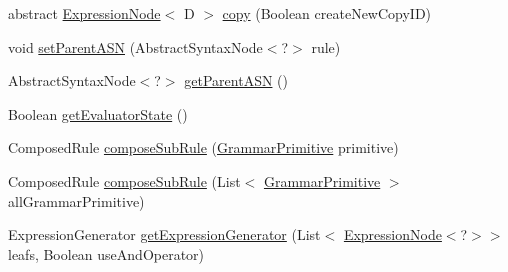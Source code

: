 \begin{DoxyCompactItemize}
\item 
abstract \hyperlink{classit_1_1emarolab_1_1cagg_1_1core_1_1language_1_1syntax_1_1expressionTree_1_1ExpressionNode_3_3eaf7c0f6a4bc47f4823e05ca883c5af_acfac8736e19e954def3e135de75d668e}{Expression\-Node}$<$ D $>$ \hyperlink{classit_1_1emarolab_1_1cagg_1_1core_1_1language_1_1syntax_1_1expressionTree_1_1ExpressionNode_3_3eaf7c0f6a4bc47f4823e05ca883c5af_a8ff9d73119feb83712da4b1f155a7e28}{copy} (Boolean create\-New\-Copy\-I\-D)
\item 
void \hyperlink{classit_1_1emarolab_1_1cagg_1_1core_1_1language_1_1syntax_1_1expressionTree_1_1ExpressionNode_3_3eaf7c0f6a4bc47f4823e05ca883c5af_a5f5eb2a9b26a70aea676fb389f1c7828}{set\-Parent\-A\-S\-N} (Abstract\-Syntax\-Node$<$?$>$ rule)
\item 
Abstract\-Syntax\-Node$<$?$>$ \hyperlink{classit_1_1emarolab_1_1cagg_1_1core_1_1language_1_1syntax_1_1expressionTree_1_1ExpressionNode_3_3eaf7c0f6a4bc47f4823e05ca883c5af_a78c2fba5ae2a3bd8bb9a6765000cab87}{get\-Parent\-A\-S\-N} ()
\item 
Boolean \hyperlink{classit_1_1emarolab_1_1cagg_1_1core_1_1language_1_1syntax_1_1expressionTree_1_1ExpressionNode_3_3eaf7c0f6a4bc47f4823e05ca883c5af_a364fef59f14fd7f4e040ba1506e586ae}{get\-Evaluator\-State} ()
\item 
Composed\-Rule \hyperlink{classit_1_1emarolab_1_1cagg_1_1core_1_1language_1_1syntax_1_1expressionTree_1_1ExpressionNode_3_3eaf7c0f6a4bc47f4823e05ca883c5af_a02bcca81eb15561bd29904c81414f57c}{compose\-Sub\-Rule} (\hyperlink{classit_1_1emarolab_1_1cagg_1_1core_1_1language_1_1syntax_1_1GrammarPrimitive}{Grammar\-Primitive} primitive)
\item 
Composed\-Rule \hyperlink{classit_1_1emarolab_1_1cagg_1_1core_1_1language_1_1syntax_1_1expressionTree_1_1ExpressionNode_3_3eaf7c0f6a4bc47f4823e05ca883c5af_a59bd64a7860dd1718a2780b93106becf}{compose\-Sub\-Rule} (List$<$ \hyperlink{classit_1_1emarolab_1_1cagg_1_1core_1_1language_1_1syntax_1_1GrammarPrimitive}{Grammar\-Primitive} $>$ all\-Grammar\-Primitive)
\item 
Expression\-Generator \hyperlink{classit_1_1emarolab_1_1cagg_1_1core_1_1language_1_1syntax_1_1expressionTree_1_1ExpressionNode_3_3eaf7c0f6a4bc47f4823e05ca883c5af_a835cc0a1d5f9c027942c199c99f5587c}{get\-Expression\-Generator} (List$<$ \hyperlink{classit_1_1emarolab_1_1cagg_1_1core_1_1language_1_1syntax_1_1expressionTree_1_1ExpressionNode_3_3eaf7c0f6a4bc47f4823e05ca883c5af_acfac8736e19e954def3e135de75d668e}{Expression\-Node}$<$?$>$$>$ leafs, Boolean use\-And\-Operator)
\item 
$$
\end{DoxyCompactItemize}
